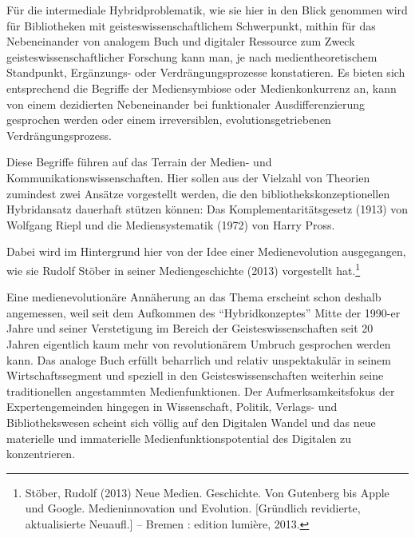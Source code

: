\documentclass[a4paper,
fontsize=11pt,
oneside,
numbers=noperiodatend,
parskip=half-,
bibliography=totoc,
final
]{scrartcl}
\begin{document}
Für die intermediale Hybridproblematik, wie sie hier in den Blick
genommen wird für Bibliotheken mit geisteswissenschaftlichem
Schwerpunkt, mithin für das Nebeneinander von analogem Buch und
digitaler Ressource zum Zweck geisteswissenschaftlicher Forschung kann
man, je nach medientheoretischem Standpunkt, Ergänzungs- oder
Verdrängungsprozesse konstatieren. Es bieten sich entsprechend die
Begriffe der Mediensymbiose oder Medienkonkurrenz an, kann von einem
dezidierten Nebeneinander bei funktionaler Ausdifferenzierung gesprochen
werden oder einem irreversiblen, evolutionsgetriebenen
Verdrängungsprozess.

Diese Begriffe führen auf das Terrain der Medien- und
Kommunikationswissenschaften. Hier sollen aus der Vielzahl von Theorien
zumindest zwei Ansätze vorgestellt werden, die den
bibliothekskonzeptionellen Hybridansatz dauerhaft stützen können: Das
Komplementaritätsgesetz (1913) von Wolfgang Riepl und die
Mediensystematik (1972) von Harry Pross.

Dabei wird im Hintergrund hier von der Idee einer Medienevolution
ausgegangen, wie sie Rudolf Stöber in seiner Mediengeschichte (2013)
vorgestellt hat.\footnote{Stöber, Rudolf (2013) Neue Medien. Geschichte.
  Von Gutenberg bis Apple und Google. Medieninnovation und Evolution.
  {[}Gründlich revidierte, aktualisierte Neuaufl.{]} -- Bremen : edition
  lumière, 2013.}

Eine medienevolutionäre Annäherung an das Thema erscheint schon deshalb
angemessen, weil seit dem Aufkommen des \enquote{Hybridkonzeptes} Mitte
der 1990-er Jahre und seiner Verstetigung im Bereich der
Geisteswissenschaften seit 20 Jahren eigentlich kaum mehr von
revolutionärem Umbruch gesprochen werden kann. Das analoge Buch erfüllt
beharrlich und relativ unspektakulär in seinem Wirtschaftssegment und
speziell in den Geisteswissenschaften weiterhin seine traditionellen
angestammten Medienfunktionen. Der Aufmerksamkeitsfokus der
Expertengemeinden hingegen in Wissenschaft, Politik, Verlags- und
Bibliothekswesen scheint sich völlig auf den Digitalen Wandel und das
neue materielle und immaterielle Medienfunktionspotential des Digitalen
zu konzentrieren.
\end{document}
